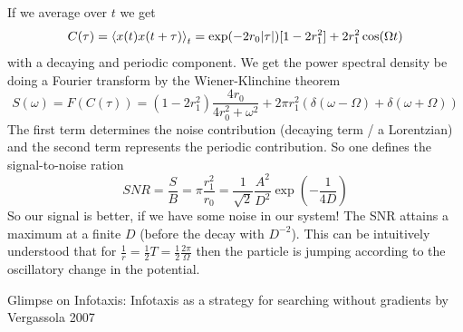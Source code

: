 \documentclass{notebook}
\begin{document}
If we average over $t$ we get
%
\begin{equation}
	C(\tau) = 	\expval{x(t) x(t+\tau)}_t = \exp(-2r_0 |\tau|) [1 - 2 r_1^2] + 2 r_1^2 \cos(\Omega t)
\end{equation}
%
with a decaying and periodic component. We get the power spectral density be doing a Fourier transform by the Wiener-Klinchine theorem
%
\begin{equation}
S(\omega) = F(C(\tau)) = (1- 2 r_1^2) \frac{4 r_0}{4 r_0^2 + \omega^2} + 2 \pi r_1^2 (\delta(\omega-\Omega) + \delta(\omega + \Omega))
\end{equation}
%
The first term determines the noise contribution (decaying term / a Lorentzian) and the second term represents the periodic contribution. So one defines the signal-to-noise ration
%
\begin{equation}
SNR = \frac{S}{B} = \pi \frac{r_1^2}{r_0} = \frac{1}{\sqrt{2}} \frac{A^2}{D^2} \exp(-\frac{1}{4 D})
\end{equation}
%
So our signal is better, if we have some noise in our system! The SNR attains a maximum at a finite $D$ (before the decay with $D^{-2}$). This can be intuitively understood that for $\frac{1}{r} = \frac{1}{2} T = \frac{1}{2} \frac{2 \pi}{\Omega}$ then the particle is jumping according to the oscillatory change in the potential. 

Glimpse on Infotaxis: Infotaxis as a strategy for searching without gradients by Vergassola 2007


\nocite{*}
\renewcommand*{\bibfont}{\small}
\printbibliography[heading=bibintoc]
\end{document}
